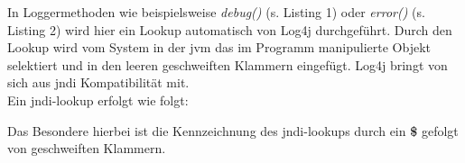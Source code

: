In Loggermethoden wie beispielsweise \textit{debug()} (s. Listing 1) oder \textit{error()} (s. Listing 2) wird hier ein Lookup automatisch von Log4j durchgeführt. Durch den Lookup wird vom System in der \gls{jvm} das im Programm
manipulierte Objekt selektiert und in den leeren geschweiften Klammern eingefügt. Log4j bringt von sich aus \gls{jndi} Kompatibilität mit.\\

Ein \gls{jndi}-lookup erfolgt wie folgt:

\vspace{0.3cm}

Das Besondere hierbei ist die Kennzeichnung des \gls{jndi}-lookups durch ein \textbf{\$} gefolgt von geschweiften Klammern.